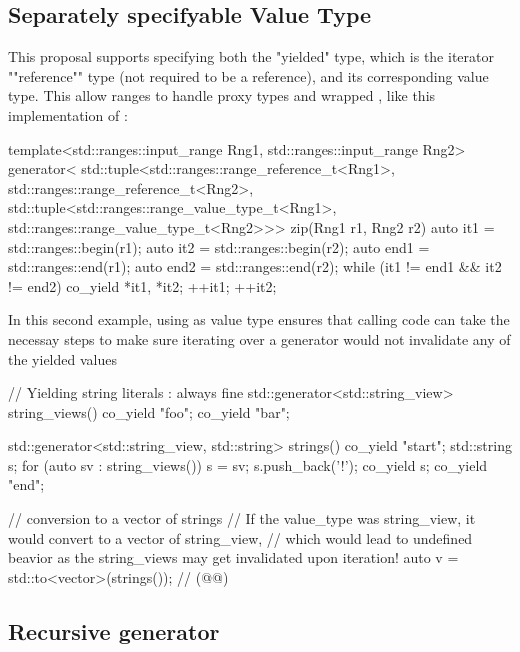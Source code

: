 \documentclass{wg21}
\begin{document}
\subsection{Separately specifyable Value Type}

This proposal supports specifying both the "yielded" type, which is the iterator ""reference"" type (not required to be a reference), and its corresponding value type.
This allow ranges to handle proxy types and wrapped , like this implementation of :

\begin{colorblock}
    template<std::ranges::input_range Rng1,
    std::ranges::input_range Rng2>
    generator<
    std::tuple<std::ranges::range_reference_t<Rng1>,
    std::ranges::range_reference_t<Rng2>,
    std::tuple<std::ranges::range_value_type_t<Rng1>,
    std::ranges::range_value_type_t<Rng2>>>
    zip(Rng1 r1, Rng2 r2) {
        auto it1 = std::ranges::begin(r1);
        auto it2 = std::ranges::begin(r2);
        auto end1 = std::ranges::end(r1);
        auto end2 = std::ranges::end(r2);
        while (it1 != end1 && it2 != end2) {
            co_yield {*it1, *it2};
            ++it1; ++it2;
        }
    }
\end{colorblock}

In this second example, using  as value type ensures that calling code can take the necessay steps
to make sure iterating over a generator would not invalidate any of the yielded values

\begin{colorblock}

// Yielding string literals : always fine
std::generator<std::string_view> string_views() {
    co_yield "foo";
    co_yield "bar";
}

std::generator<std::string_view, std::string> strings() {
    co_yield "start";
    std::string s;
    for (auto sv : string_views()) {
        s = sv;
        s.push_back('!');
        co_yield s;
    }
    co_yield "end";
}

// conversion to a vector of strings
// If the value_type was string_view, it would convert to a vector of string_view,
// which would lead to undefined beavior as the string_views may get invalidated upon iteration!
auto v = std::to<vector>(strings()); // (@{}@)

\end{colorblock}


\subsection{Recursive generator}
\end{document}
